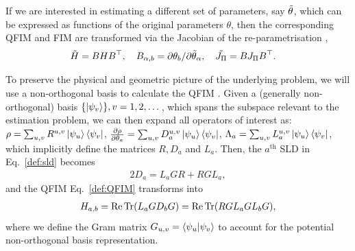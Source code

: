 \documentclass[reprint,amsmath,amssymb,aps,prl,floatfix,groupedaddress,superscriptaddress]{revtex4-2}
\begin{document}
If we are interested in estimating a different set of parameters, say $\Tilde{\theta}$, which can be expressed as functions of the original parameters $\theta$, then the corresponding QFIM and FIM are transformed via the Jacobian of the re-parametrisation \cite{paris2009quantum,liu2020quantum},
\begin{align}
    \Tilde{H} &= B H B^\top, \quad
    B_{\alpha,b} = \partial{\theta_b}/\partial{\Tilde{\theta}_\alpha}, \quad     \Tilde{J_\Pi} = B J_\Pi B^\top.
    \label{def:jacobian}
\end{align}

To preserve the physical and geometric picture of the underlying problem, we will use a non-orthogonal basis to calculate the QFIM \cite{genoni2019non,napoli2019towards,fiderer2021general}. Given a (generally non-orthogonal) basis $\{\ket{\psi_v}\}, v = 1,2,\dots$, which spans the subspace relevant to the estimation problem, we can then expand all operators of interest as:
$\rho = \sum_{u,v} R^{u,v} \ket{\psi_u}\bra{\psi_v}$, $\pdv{\rho}{\theta_a} = \sum_{u,v} D_a^{u,v} \ket{\psi_u}\bra{\psi_v}$,
$\Lambda_a =  \sum_{u,v} L_a^{u,v} \ket{\psi_u}\bra{\psi_v}$,
which implicitly define the matrices ${R}, D_a$ and $L_a$. Then, the $a^{\textrm{th}}$ SLD in Eq.~\eqref{def:sld} becomes
\begin{align}
    2 {D}_a = {L}_a{G}{R} + {R}{G}{L}_a,
    \label{eq:sld_nonorthogonal}
\end{align}
and the QFIM Eq.~\eqref{def:QFIM} transforms into
\begin{align}
    H_{a,b} = \Re \Tr (L_a G D_b G) =  \Re \Tr( R G L_a  G L_b G),
    \label{eq:qfi_nonorthogonal}
\end{align}
where we define the Gram matrix $G_{u,v}=\braket{\psi_u}{\psi_v}$ to account for the potential non-orthogonal basis representation.
\end{document}
